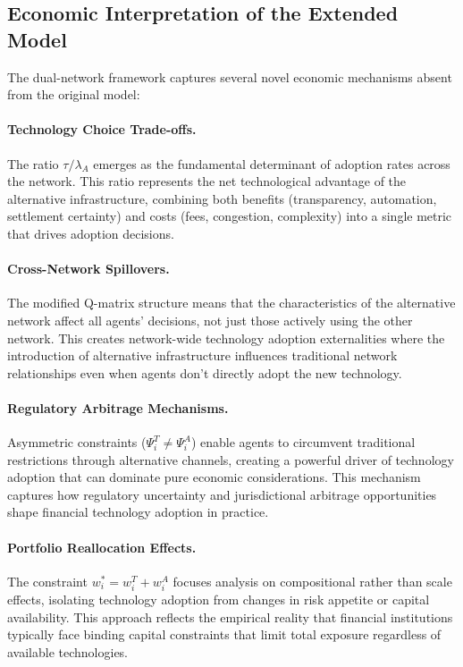 \subsection{Economic Interpretation of the Extended Model}

The dual-network framework captures several novel economic mechanisms absent from the original model:

\paragraph{Technology Choice Trade-offs.} The ratio $\tau/\lambda_A$ emerges as the fundamental determinant of adoption rates across the network. This ratio represents the net technological advantage of the alternative infrastructure, combining both benefits (transparency, automation, settlement certainty) and costs (fees, congestion, complexity) into a single metric that drives adoption decisions.

\paragraph{Cross-Network Spillovers.} The modified Q-matrix structure means that the characteristics of the alternative network affect all agents' decisions, not just those actively using the other network. This creates network-wide technology adoption externalities where the introduction of alternative infrastructure influences traditional network relationships even when agents don't directly adopt the new technology.

\paragraph{Regulatory Arbitrage Mechanisms.} Asymmetric constraints ($\Psi_i^T \neq \Psi_i^A$) enable agents to circumvent traditional restrictions through alternative channels, creating a powerful driver of technology adoption that can dominate pure economic considerations. This mechanism captures how regulatory uncertainty and jurisdictional arbitrage opportunities shape financial technology adoption in practice.

\paragraph{Portfolio Reallocation Effects.} The constraint $w_i^* = w_i^T + w_i^A$ focuses analysis on compositional rather than scale effects, isolating technology adoption from changes in risk appetite or capital availability. This approach reflects the empirical reality that financial institutions typically face binding capital constraints that limit total exposure regardless of available technologies.

